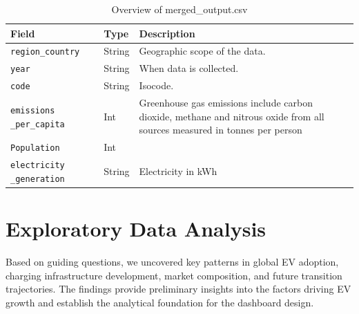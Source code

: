 \documentclass[12pt,conference]{IEEEtran}
\begin{document}
\begin{table}[htpb]
  \centering
  \caption{Overview of merged\_output.csv}
  \label{tab:dataset}
  \begin{tabular}{|p{2.8cm}|l|p{3.8cm}|}
    \hline
    \textbf{Field} & \textbf{Type}   & \textbf{Description} \\
    \hline
    \texttt{region\_country}        & String     & Geographic scope of the data. \\
    \hline
    \texttt{year}  & String & When data is collected. \\
    \hline
    \texttt{code} & String   & Isocode. \\
    \hline
    \texttt{emissions \_per\_capita}  & Int & Greenhouse gas emissions include carbon dioxide, methane and nitrous oxide from all sources measured in tonnes per person \\
    \hline
    \texttt{Population} & Int & \\
    \hline
    \texttt{electricity \_generation}  & String & Electricity in kWh \\
    \hline
  \end{tabular}
\end{table}

\section{Exploratory Data Analysis}
Based on guiding questions, we uncovered key patterns in global EV adoption, charging infrastructure development, market composition, and future transition trajectories. The findings provide preliminary insights into the factors driving EV growth and establish the analytical foundation for the dashboard design.
\end{document}
